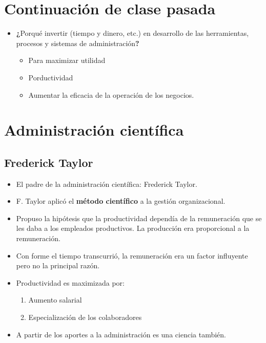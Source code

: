 \section{Continuación de clase pasada}
\begin{itemize}
    \item \textbf{¿}Porqué invertir (tiempo y dinero, etc.) en desarrollo de las herramientas, procesos y sistemas de administración\textbf{?}
        \begin{itemize}
            \item Para maximizar utilidad 
            \item Porductividad 
            \item Aumentar la eficacia de la operación de los negocios.
        \end{itemize}
\end{itemize}



\section{Administración científica}
\subsection{Frederick Taylor} 
\begin{itemize}
    \item El padre de la administración científica: Frederick Taylor.
    \item F. Taylor aplicó el \textbf{método científico} a la gestión organizacional. 
    \item Propuso la hipótesis que la productividad dependía de la remuneración que se les daba a los empleados productivos. La producción era proporcional a la remuneración.
    \item Con forme el tiempo transcurrió, la remuneración era un factor influyente pero no la principal razón.
    \item Productividad es maximizada por: 
        \begin{enumerate}
            \item Aumento salarial 
            \item Especialización de los colaboradores
        \end{enumerate}
    
    \item A partir de los aportes a la administración es una ciencia también.
\end{itemize}


